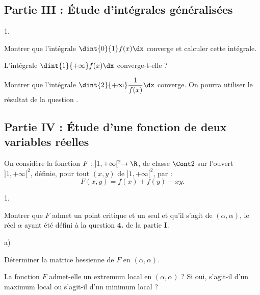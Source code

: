 \documentclass[11pt]{article}%
\begin{document}
\subsection*{Partie III : Étude d'intégrales généralisées}
\begin{noliste}{1.}
\setlength{\itemsep}{2mm}
\setcounter{enumi}{9}
\item Montrer que l'intégrale $\dint{0}{1} f(x)\dx$ converge et 
calculer 
cette intégrale.


 
\item L'intégrale $\dint{1}{+\infty} f(x)\dx$ converge-t-elle ?

  


\item Montrer que l'intégrale $\dint{2}{+\infty} \dfrac{1}{f(x)}\dx$
  converge.  On pourra utiliser le résultat de la question
  .


\end{noliste}


\subsection*{Partie IV : Étude d'une fonction de deux variables
  réelles}

\noindent
On considère la fonction $F: \ ]1,+\infty[^2 \rightarrow \R$, de classe 
$\Cont 2$ sur l'ouvert $]1,+\infty[^2$, définie, pour tout $(x,y)$ de 
$]1,+\infty[^2$, par :
\[
F(x,y)=f(x)+f(y)-xy.
\]
\begin{noliste}{1.}
\setlength{\itemsep}{2mm}
\setcounter{enumi}{12}
\item Montrer que $F$ admet un point critique et un seul et qu'il 
s'agit 
de $(\alpha,\alpha)$, le réel $\alpha$ ayant été défini à la question 
{\bf 4.} de la partie {\bf I}.




\item \begin{noliste}{a)}
	\item Déterminer la matrice hessienne de $F$ en 
	$(\alpha,\alpha)$.
	
	
	
	\item La fonction $F$ admet-elle un extremum local en 
	$(\alpha,\alpha)$ ? Si oui, s'agit-il d'un maximum local ou 
	s'agit-il d'un minimum local ?
	
	
	\end{noliste}
\end{noliste}
\end{document}
